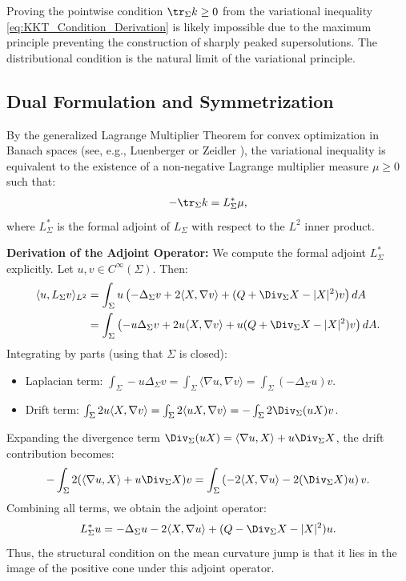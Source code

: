 \begin{remark}\label{rem:ConjectureCFundamental}
Proving the pointwise condition $\tr_\Sigma k \ge 0$ from the variational inequality \eqref{eq:KKT_Condition_Derivation} is likely impossible due to the maximum principle preventing the construction of sharply peaked supersolutions. The distributional condition is the natural limit of the variational principle.
\end{remark}

\subsection{Dual Formulation and Symmetrization}

By the generalized Lagrange Multiplier Theorem for convex optimization in Banach spaces (see, e.g., Luenberger \cite[Section 8.3, Theorem 1]{luenberger1969} or Zeidler \cite[Section 48.3]{zeidler1985}), the variational inequality is equivalent to the existence of a non-negative Lagrange multiplier measure $\mu \ge 0$ such that:
\begin{equation}
    -\tr_\Sigma k = L_\Sigma^* \mu,
\end{equation}
where $L_\Sigma^*$ is the formal adjoint of $L_\Sigma$ with respect to the $L^2$ inner product.

\textbf{Derivation of the Adjoint Operator:}
We compute the formal adjoint $L_\Sigma^*$ explicitly. Let $u, v \in C^\infty(\Sigma)$. Then:
\begin{align*}
    \langle u, L_\Sigma v \rangle_{L^2} &= \int_\Sigma u \left( -\Delta_\Sigma v + 2\langle X, \nabla v \rangle + (Q + \Div_\Sigma X - |X|^2)v \right) dA \\
    &= \int_\Sigma \left( -u \Delta_\Sigma v + 2u \langle X, \nabla v \rangle + u(Q + \Div_\Sigma X - |X|^2)v \right) dA.
\end{align*}
Integrating by parts (using that $\Sigma$ is closed):
\begin{itemize}
    \item Laplacian term: $\int_\Sigma -u \Delta_\Sigma v = \int_\Sigma \langle \nabla u, \nabla v \rangle = \int_\Sigma (-\Delta_\Sigma u) v$.
    \item Drift term: $\int_\Sigma 2u \langle X, \nabla v \rangle = \int_\Sigma 2 \langle uX, \nabla v \rangle = -\int_\Sigma 2 \Div_\Sigma(uX) v$.
\end{itemize}
Expanding the divergence term $\Div_\Sigma(uX) = \langle \nabla u, X \rangle + u \Div_\Sigma X$, the drift contribution becomes:
\[
    -\int_\Sigma 2 (\langle \nabla u, X \rangle + u \Div_\Sigma X) v = \int_\Sigma \left( -2\langle X, \nabla u \rangle - 2(\Div_\Sigma X)u \right) v.
\]
Combining all terms, we obtain the adjoint operator:
\begin{equation}
    L_\Sigma^* u = -\Delta_\Sigma u - 2\langle X, \nabla u \rangle + (Q - \Div_\Sigma X - |X|^2)u.
\end{equation}
Thus, the structural condition on the mean curvature jump is that it lies in the image of the positive cone under this adjoint operator.

